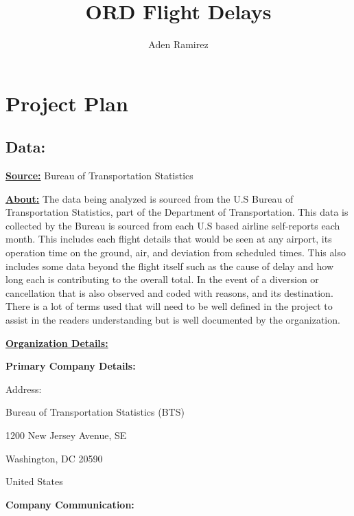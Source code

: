 \documentclass[a4paper,12pt]{article}
\begin{document}
\title{ORD Flight Delays}
\author{Aden Ramirez}
\maketitle

\begin{abstract}
\end{abstract}


\pagebreak

\tableofcontents

\pagebreak

\section{Project Plan}

\subsection{Data:}

\textbf{\underline{Source:}} Bureau of Transportation Statistics

\noindent \textbf{\underline{About:}}
The data being analyzed is sourced from the U.S Bureau of Transportation Statistics, part of the
Department of Transportation. This data is collected by the Bureau is sourced from each U.S
based airline self-reports each month. This includes each flight details that would be seen at
any airport, its operation time on the ground, air, and deviation from scheduled times. This also
includes some data beyond the flight itself such as the cause of delay and how long each is
contributing to the overall total. In the event of a diversion or cancellation that is also observed
and coded with reasons, and its destination. There is a lot of terms used that will need to be
well defined in the project to assist in the readers understanding but is well documented by the
organization.

\noindent \textbf{\underline{Organization Details:}}

\textbf{Primary Company Details:}

Address:

Bureau of Transportation Statistics (BTS)

1200 New Jersey Avenue, SE

Washington, DC 20590

United States

\textbf{Company Communication:}
\end{document}
